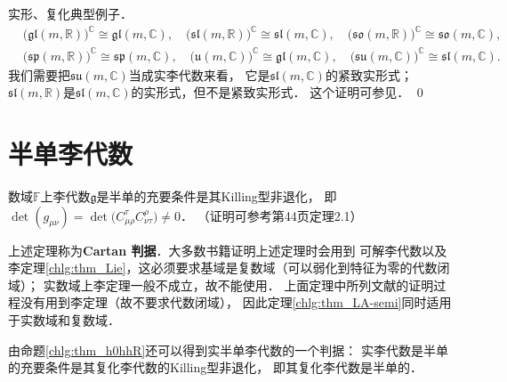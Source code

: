 \begin{example}\label{chlg:exam_real-complex}
    实形、复化典型例子．
    \begin{align*}
        &\bigl(\mathfrak{gl}(m,\mathbb{R}) \bigr)^{\mathbb{C}} \cong \mathfrak{gl}(m,\mathbb{C}), \quad
        \bigl(\mathfrak{sl}(m,\mathbb{R}) \bigr)^{\mathbb{C}} \cong \mathfrak{sl}(m,\mathbb{C}), \quad
        \bigl(\mathfrak{so}(m,\mathbb{R}) \bigr)^{\mathbb{C}} \cong \mathfrak{so}(m,\mathbb{C}), \\
        &\bigl(\mathfrak{sp}(m,\mathbb{R}) \bigr)^{\mathbb{C}} \cong \mathfrak{sp}(m,\mathbb{C}), \quad
        \bigl(\mathfrak{u}(m,\mathbb{C}) \bigr)^{\mathbb{C}} \cong \mathfrak{gl}(m,\mathbb{C}), \quad
        \bigl(\mathfrak{su}(m,\mathbb{C}) \bigr)^{\mathbb{C}} \cong \mathfrak{sl}(m,\mathbb{C}).
    \end{align*}
    我们需要把$\mathfrak{su}(m,\mathbb{C})$当成实李代数来看，
    它是$\mathfrak{sl}(m,\mathbb{C})$的紧致实形式；
    $\mathfrak{sl}(m,\mathbb{R})$是$\mathfrak{sl}(m,\mathbb{C})$的实形式，但不是紧致实形式．
    这个证明可参见\parencite[p.266]{wanzx-2013}． \qed
\end{example}




\section{半单李代数}





\begin{theorem}\label{chlg:thm_LA-semi}
    数域$\mathbb{F}$上李代数$\mathfrak{g}$是半单的充要条件是其Killing型非退化，
    即$\det(g_{\mu\nu}) =\det\bigl( C^\tau_{\mu\rho} C^\rho_{\nu\tau}\bigr) \neq 0$．
    （证明可参考\parencite[\S 6.2]{serre-1992}第44页定理2.1）
\end{theorem}


上述定理称为{\heiti \bfseries Cartan 判据}．大多数书籍证明上述定理时会用到
可解李代数以及李定理\ref{chlg:thm_Lie}，这必须要求基域是复数域（可以弱化到特征为零的代数闭域）；
实数域上李定理一般不成立，故不能使用．
上面定理中所列文献的证明过程没有用到李定理（故不要求代数闭域），
因此定理\ref{chlg:thm_LA-semi}同时适用于实数域和复数域．

由命题\ref{chlg:thm_h0hhR}还可以得到实半单李代数的一个判据：
实李代数是半单的充要条件是其复化李代数的Killing型非退化，
即其复化李代数是半单的．


